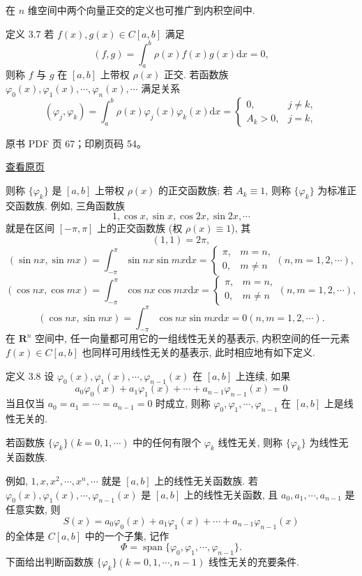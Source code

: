 在 \(n\) 维空间中两个向量正交的定义也可推广到内积空间中.

定义 3.7 若 \(f(x), g(x) \in C[a, b]\) 满足 \[
(f, g) = \int_{a}^{b} \rho(x) f(x) g(x) \mathrm{d}x = 0, \tag{3.3.7}
\] 则称 \(f\) 与 \(g\) 在 \([a, b]\) 上带权 \(\rho(x)\) 正交. 若函数族 \(\varphi_{0}(x), \varphi_{1}(x), \cdots, \varphi_{n}(x), \cdots\) 满足关系 \[
(\varphi_{j}, \varphi_{k}) = \int_{a}^{b} \rho(x) \varphi_{j}(x) \varphi_{k}(x) \mathrm{d}x = \begin{cases} 0, & j \neq k, \\ A_{k} > 0, & j = k, \end{cases} \tag{3.3.8}
\]

\clearpage

原书 PDF 页 67；印刷页码 54。

\href{source-images/pdf-067.jpeg}{查看原页}

则称 \(\{\varphi_k\}\) 是 \([a,b]\) 上带权 \(\rho(x)\) 的正交函数族; 若 \(A_k \equiv 1\), 则称 \(\{\varphi_k\}\) 为标准正交函数族. 例如, 三角函数族 \[
1, \cos x, \sin x, \cos 2x, \sin 2x, \cdots
\] 就是在区间 \([-\pi, \pi]\) 上的正交函数族 (权 \(\rho(x) \equiv 1\)), 其 \[
(1,1) = 2\pi,
\] \[
(\sin nx, \sin mx) = \int_{-\pi}^{\pi} \sin nx \sin mx \mathrm{d}x = \begin{cases} \pi, & m=n, \\ 0, & m \neq n \end{cases} (n,m=1,2, \cdots),
\] \[
(\cos nx, \cos mx) = \int_{-\pi}^{\pi} \cos nx \cos mx \mathrm{d}x = \begin{cases} \pi, & m=n, \\ 0, & m \neq n \end{cases} (n,m=1,2, \cdots),
\] \[
(\cos nx, \sin mx) = \int_{-\pi}^{\pi} \cos nx \sin mx \mathrm{d}x = 0 (n,m=1,2, \cdots).
\] 在 \(\mathbf{R}^n\) 空间中, 任一向量都可用它的一组线性无关的基表示, 内积空间的任一元素 \(f(x) \in C[a,b]\) 也同样可用线性无关的基表示, 此时相应地有如下定义.

定义 3.8 设 \(\varphi_0(x), \varphi_1(x), \cdots, \varphi_{n-1}(x)\) 在 \([a,b]\) 上连续, 如果 \[
a_0 \varphi_0(x) + a_1 \varphi_1(x) + \cdots + a_{n-1} \varphi_{n-1}(x) = 0
\] 当且仅当 \(a_0 = a_1 = \cdots = a_{n-1} = 0\) 时成立, 则称 \(\varphi_0, \varphi_1, \cdots, \varphi_{n-1}\) 在 \([a,b]\) 上是线性无关的.

若函数族 \(\{\varphi_k\} (k=0,1, \cdots)\) 中的任何有限个 \(\varphi_k\) 线性无关, 则称 \(\{\varphi_k\}\) 为线性无关函数族.

例如, \(1, x, x^2, \cdots, x^n, \cdots\) 就是 \([a,b]\) 上的线性无关函数族. 若 \(\varphi_0(x), \varphi_1(x), \cdots, \varphi_{n-1}(x)\) 是 \([a,b]\) 上的线性无关函数, 且 \(a_0, a_1, \cdots, a_{n-1}\) 是任意实数, 则 \[
S(x) = a_0 \varphi_0(x) + a_1 \varphi_1(x) + \cdots + a_{n-1} \varphi_{n-1}(x)
\] 的全体是 \(C[a,b]\) 中的一个子集, 记作 \[
\Phi = \operatorname{span}\{\varphi_0, \varphi_1, \cdots, \varphi_{n-1}\}. \tag{3.3.9}
\] 下面给出判断函数族 \(\{\varphi_k\} (k=0,1, \cdots, n-1)\) 线性无关的充要条件.

